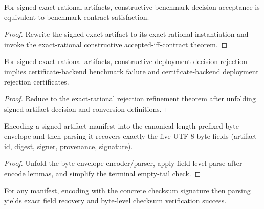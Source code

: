 \begin{theorem}
\label{thm:definitive-signed-exact-rat-accepted-iff-benchmark-contract}
For signed exact-rational artifacts, constructive benchmark decision acceptance is equivalent to benchmark-contract satisfaction.
\end{theorem}

\begin{proof}
Rewrite the signed exact artifact to its exact-rational instantiation and invoke the exact-rational constructive accepted-iff-contract theorem.
\end{proof}

\begin{theorem}
\label{thm:definitive-signed-exact-rat-rejected-refines-certificate-backend-rejections}
For signed exact-rational artifacts, constructive deployment decision rejection implies certificate-backend benchmark failure and certificate-backend deployment rejection certificates.
\end{theorem}

\begin{proof}
Reduce to the exact-rational rejection refinement theorem after unfolding signed-artifact decision and conversion definitions.
\end{proof}

\begin{theorem}
\label{thm:definitive-signed-artifact-byte-envelope-roundtrip}
Encoding a signed artifact manifest into the canonical length-prefixed byte-envelope and then parsing it recovers exactly the five UTF-8 byte fields (artifact id, digest, signer, provenance, signature).
\end{theorem}

\begin{proof}
Unfold the byte-envelope encoder/parser, apply field-level parse-after-encode lemmas, and simplify the terminal empty-tail check.
\end{proof}

\begin{theorem}
\label{thm:definitive-concrete-checksum-byte-e2e}
For any manifest, encoding with the concrete checksum signature then parsing yields exact field recovery and byte-level checksum verification success.
\end{theorem}


